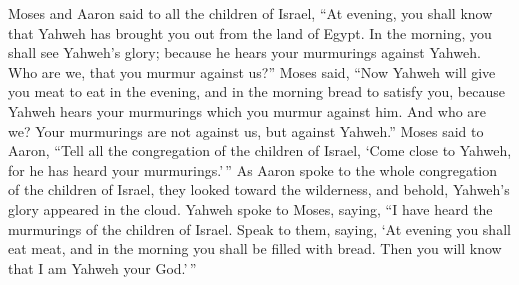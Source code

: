  Moses and Aaron said to all the children of Israel, ``At
evening, you shall know that Yahweh has brought you out from the land of
Egypt.  In the morning, you shall see Yahweh's glory;
because he hears your murmurings against Yahweh. Who are we, that you
murmur against us?''  Moses said, ``Now Yahweh will give
you meat to eat in the evening, and in the morning bread to satisfy you,
because Yahweh hears your murmurings which you murmur against him. And
who are we? Your murmurings are not against us, but against Yahweh.''
 Moses said to Aaron, ``Tell all the congregation of the
children of Israel, `Come close to Yahweh, for he has heard your
murmurings.'\,''  As Aaron spoke to the whole
congregation of the children of Israel, they looked toward the
wilderness, and behold, Yahweh's glory appeared in the cloud.
 Yahweh spoke to Moses, saying,  ``I have
heard the murmurings of the children of Israel. Speak to them, saying,
`At evening you shall eat meat, and in the morning you shall be filled
with bread. Then you will know that I am Yahweh your God.'\,''

